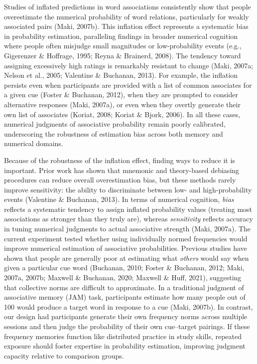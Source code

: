 \documentclass[
  man,floatsintext]{apa7}
\begin{document}
Studies of inflated predictions in word associations consistently show
that people overestimate the numerical probability of word relations,
particularly for weakly associated pairs (Maki, 2007b). This inflation
effect represents a systematic bias in probability estimation,
paralleling findings in broader numerical cognition where people often
misjudge small magnitudes or low-probability events (e.g., Gigerenzer \& Hoffrage, 1995; Reyna \& Brainerd, 2008). The tendency toward assigning excessively
high ratings is remarkably resistant to change (Maki, 2007a; Nelson et al., 2005; Valentine \& Buchanan, 2013). For example, the inflation persists even
when participants are provided with a list of common associates for a
given cue (Foster \& Buchanan, 2012), when they are prompted to consider alternative
responses (Maki, 2007a), or even when they overtly generate their own
list of associates (Koriat, 2008; Koriat \& Bjork, 2006). In all these cases,
numerical judgments of associative probability remain poorly calibrated,
underscoring the robustness of estimation bias across both memory and
numerical domains.

Because of the robustness of the inflation effect, finding ways to
reduce it is important. Prior work has shown that mnemonic and
theory-based debiasing procedures can reduce overall overestimation
bias, but these methods rarely improve sensitivity: the ability to
discriminate between low- and high-probability events (Valentine \& Buchanan, 2013).
In terms of numerical cognition, \emph{bias} reflects a systematic tendency
to assign inflated probability values (treating most associations as
stronger than they truly are), whereas \emph{sensitivity} reflects accuracy
in tuning numerical judgments to actual associative strength
(Maki, 2007a). The current experiment tested whether using individually
normed frequencies would improve numerical estimation of associative
probabilities. Previous studies have shown that people are generally
poor at estimating what \emph{others} would say when given a particular cue
word (Buchanan, 2010; Foster \& Buchanan, 2012; Maki, 2007a, 2007b; Maxwell \& Buchanan, 2020; Maxwell \& Huff, 2021), suggesting that collective norms are difficult to
approximate. In a traditional judgment of associative memory (JAM) task,
participants estimate how many people out of 100 would produce a target
word in response to a cue (Maki, 2007b). In contrast, our design had
participants generate their own frequency norms across multiple sessions
and then judge the probability of their own cue--target pairings. If
these frequency memories function like distributed practice in study
skills, repeated exposure should foster expertise in probability
estimation, improving judgment capacity relative to comparison groups.
\end{document}
